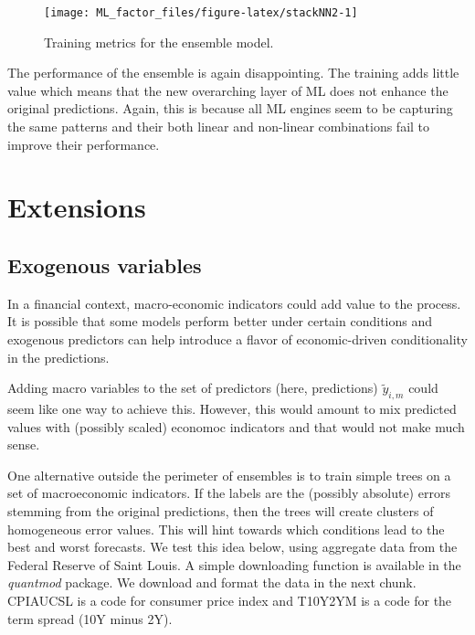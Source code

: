 \documentclass[]{krantz}
\theoremstyle{definition}
\theoremstyle{definition}
\theoremstyle{definition}
\theoremstyle{remark}
\begin{document}
\begin{figure}[H]

{\centering \texttt{[image: ML\_factor\_files/figure-latex/stackNN2-1]} 

}

\caption{Training metrics for the ensemble model.}\label{fig:stackNN2}
\end{figure}

\normalsize

The performance of the ensemble is again disappointing. The training
adds little value which means that the new overarching layer of ML does
not enhance the original predictions. Again, this is because all ML
engines seem to be capturing the same patterns and their both linear and
non-linear combinations fail to improve their performance.

\hypertarget{extensions-1}{%
\section{Extensions}\label{extensions-1}}

\hypertarget{exogenous-variables}{%
\subsection{Exogenous variables}\label{exogenous-variables}}

In a financial context, macro-economic indicators could add value to the
process. It is possible that some models perform better under certain
conditions and exogenous predictors can help introduce a flavor of
economic-driven conditionality in the predictions.

Adding macro variables to the set of predictors (here, predictions)
\(\tilde{y}_{i,m}\) could seem like one way to achieve this. However,
this would amount to mix predicted values with (possibly scaled)
economoc indicators and that would not make much sense.

One alternative outside the perimeter of ensembles is to train simple
trees on a set of macroeconomic indicators. If the labels are the
(possibly absolute) errors stemming from the original predictions, then
the trees will create clusters of homogeneous error values. This will
hint towards which conditions lead to the best and worst forecasts. We
test this idea below, using aggregate data from the Federal Reserve of
Saint Louis. A simple downloading function is available in the
\emph{quantmod} package. We download and format the data in the next
chunk. CPIAUCSL is a code for consumer price index and T10Y2YM is a code
for the term spread (10Y minus 2Y).
\end{document}
